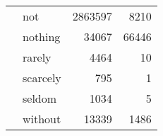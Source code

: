 \begin{longtable}[ht]{llrr}
 & not & {\cellcolor[HTML]{081D58}} \color[HTML]{F1F1F1} 2863597 & {\cellcolor[HTML]{EDF8B2}} \color[HTML]{000000} 8210 \\
 & nothing & {\cellcolor[HTML]{FEFFD6}} \color[HTML]{000000} 34067 & {\cellcolor[HTML]{081D58}} \color[HTML]{F1F1F1} 66446 \\
 & rarely & {\cellcolor[HTML]{FFFFD9}} \color[HTML]{000000} 4464 & {\cellcolor[HTML]{FFFFD9}} \color[HTML]{000000} 10 \\
 & scarcely & {\cellcolor[HTML]{FFFFD9}} \color[HTML]{000000} 795 & {\cellcolor[HTML]{FFFFD9}} \color[HTML]{000000} 1 \\
 & seldom & {\cellcolor[HTML]{FFFFD9}} \color[HTML]{000000} 1034 & {\cellcolor[HTML]{FFFFD9}} \color[HTML]{000000} 5 \\
 & without & {\cellcolor[HTML]{FEFFD8}} \color[HTML]{000000} 13339 & {\cellcolor[HTML]{FCFED3}} \color[HTML]{000000} 1486 \\
\cline{1-4}
\end{longtable}
